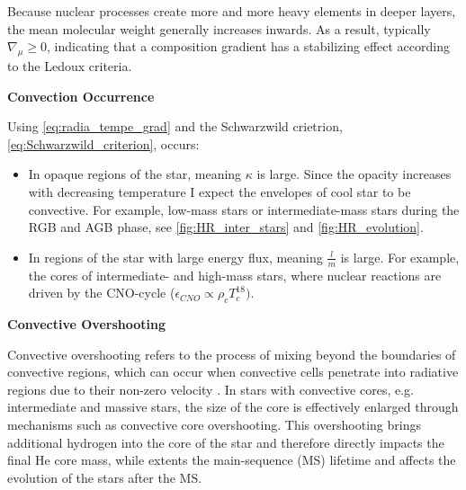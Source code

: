 Because nuclear processes create more and more heavy elements in deeper layers, the mean molecular weight generally increases inwards. As a result, typically $\nabla_{\mu} \geq 0$, indicating that a composition gradient has a stabilizing effect according to the Ledoux criteria. 

{\bf Convection Occurrence}

Using \eqref{eq:radia_tempe_grad} and the Schwarzwild crietrion, \eqref{eq:Schwarzwild_criterion}, occurs:
\begin{itemize}
    \item In opaque regions of the star, meaning $\kappa$ is large. Since the opacity increases with decreasing temperature \citep{pols2011stellar} I expect the envelopes of cool star to be convective. For example, low-mass stars or intermediate-mass stars during the RGB and AGB phase, see \cref{fig:HR_inter_stars} and \cref{fig:HR_evolution}.
    \item In regions of the star with large energy flux, meaning $\frac{l}{m}$ is large. For example, the cores of intermediate- and high-mass stars, where nuclear reactions are driven by the CNO-cycle ($\epsilon_{CNO} \propto \rho_c T_{c}^{18})$.
\end{itemize}

{\bf Convective Overshooting}

Convective overshooting refers to the process of mixing beyond the boundaries of convective regions, which can occur when convective cells penetrate into radiative regions due to their non-zero velocity \citep{alongi1993evolutionary,brott2011rotating,schootemeijer2019constraining}. In stars with convective cores, e.g. intermediate and massive stars, the size of the core is effectively enlarged through mechanisms such as convective core overshooting. This overshooting brings additional hydrogen into the core of the star and therefore directly impacts the final He core mass, while extents the main-sequence (MS) lifetime and affects the evolution of the stars after the MS.

